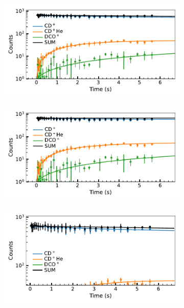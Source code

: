 \begin{figure}[!htb]

    \centering

    \begin{subfigure}[b]{0.49\textwidth}
        \centering
        \includegraphics[width=1\textwidth]{figures/measurements/kinetics/loss_channels/m_30_loss_only.pdf}
        \caption{}
        
    \end{subfigure}
    \hfill
    \begin{subfigure}[b]{0.49\textwidth}
        \centering
        \includegraphics[width=1\textwidth]{figures/measurements/kinetics/loss_channels/trap_and_m_30_loss.pdf}
        \caption{}
        
    \end{subfigure}
    
    \begin{subfigure}[b]{0.49\textwidth}
        \centering
        \includegraphics[width=1\textwidth]{figures/measurements/kinetics/loss_channels/m_30_loss_only_zoomed.pdf}
        \caption{}
        

\end{subfigure}
\end{figure}

